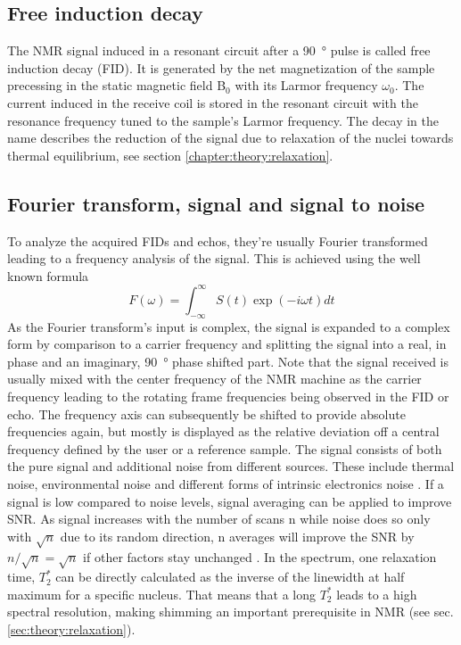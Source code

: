         \subsection{Free induction decay}
        The NMR signal induced in a resonant circuit after a \SI{90}{\degree} pulse is called free induction decay (FID). It is generated by the net magnetization of the sample precessing in the static magnetic field B$_0$ with its Larmor frequency $\omega_0$. The current induced in the receive coil is stored in the resonant circuit with the resonance frequency tuned to the sample's Larmor frequency. The decay in the name describes the reduction of the signal due to relaxation of the nuclei towards thermal equilibrium, see section \ref{chapter:theory:relaxation}.
        \subsection{Fourier transform, signal and signal to noise}
        \label{chapter:theory:fourierTransform}
            To analyze the acquired FIDs and echos, they're usually Fourier transformed leading to a frequency analysis of the signal. This is achieved using the well known formula \cite{farrar_pulse_2012}
            \begin{equation}
                F(\omega) = \int^{\infty}_{-\infty}S(t) \exp(-i\omega t)dt
            \end{equation}
            As the Fourier transform's input is complex, the signal is expanded to a complex form by comparison to a carrier frequency and splitting the signal into a real, in phase and an imaginary, \SI{90}{\degree} phase shifted part.
            Note that the signal received is usually mixed with the center frequency of the NMR machine as the carrier frequency leading to the rotating frame frequencies being observed in the FID or echo. The frequency axis can subsequently be shifted to provide absolute frequencies again, but mostly is displayed as the relative deviation off a central frequency defined by the user or a reference sample.
            The signal consists of both the pure signal and additional noise from different sources. These include thermal noise, environmental noise and different forms of intrinsic electronics noise \cite{noauthor_henry_nodate}.
            If a signal is low compared to noise levels, signal averaging can be applied to improve SNR. As signal increases with the number of scans n while noise does so only with $\sqrt n$ due to its random direction, n averages will improve the SNR by $n/\sqrt{n} = \sqrt{n}$ if other factors stay unchanged \cite{edelstein_intrinsic_1986}.
            In the spectrum, one relaxation time, $T_2^*$ can be directly calculated as the inverse of the linewidth at half maximum for a specific nucleus. That means that a long $T_2^*$ leads to a high spectral resolution, making shimming an important prerequisite in NMR (see sec. \ref{sec:theory:relaxation}).
